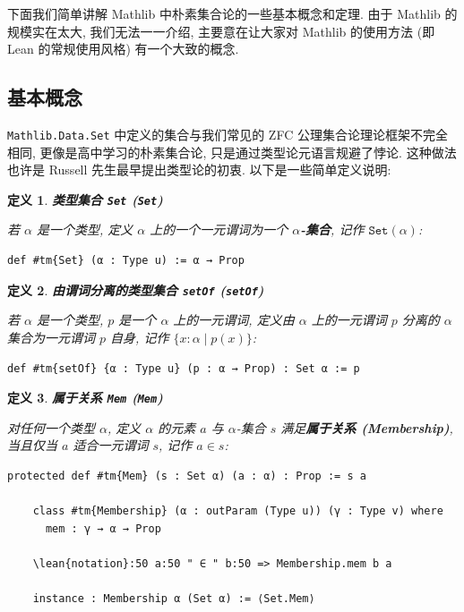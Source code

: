 \documentclass[UTF8]{ctexart}
\DeclareMathOperator{\0}{\mathbf{0}}                    %
\newcommand{\<}{\langle}
\renewcommand{\>}{\rangle}                              %
\newenvironment{dfn_box}{
    \begin{tcolorbox}[enhanced, colback=dfn_green2, boxrule=0pt, frame hidden,
        borderline west={0.7mm}{0.1mm}{dfn_green1},breakable]
    }
    {\end{tcolorbox}}
\theoremstyle{MyStyle} %
\newtheorem{definition}{定义}[subsection]
\newenvironment{dfn}[2]
{
    \begin{dfn_box}
        \begin{definition}
            \textbf{#1
                \ifx\relax#2\relax\else %
                    (#2) %
                \fi}
            \newline
}
{
        \end{definition}
    \end{dfn_box}
}
\newcommand*{\lean}[1]{\texttt{\color{blue}#1}}
\begin{document}
        下面我们简单讲解 Mathlib 中朴素集合论的一些基本概念和定理. 由于 Mathlib 的规模实在太大, 我们无法一一介绍, 主要意在让大家对 Mathlib 的使用方法 (即 Lean 的常规使用风格) 有一个大致的概念. 

    \subsection{基本概念}

    \texttt{Mathlib.Data.Set} 中定义的集合与我们常见的 ZFC 公理集合论理论框架不完全相同, 更像是高中学习的朴素集合论, 只是通过类型论元语言规避了悖论. 这种做法也许是 Russell 先生最早提出类型论的初衷. 以下是一些简单定义说明: 
        
        \begin{dfn}
            {类型集合}
            {\texttt{Set}}
            若 $\alpha$ 是一个类型, 定义 $\alpha$ 上的一个一元谓词为一个 \textbf{$\alpha$-集合}, 记作 $\texttt{Set}(\alpha)$: 
            \begin{lstlisting}[style=lean]
    def #tm{Set} (α : Type u) := α → Prop
            \end{lstlisting}
        \end{dfn}

        \begin{dfn}
            {由谓词分离的类型集合}
            {\texttt{setOf}}
            若 $\alpha$ 是一个类型, $p$ 是一个 $\alpha$ 上的一元谓词, 定义由 $\alpha$ 上的一元谓词 $p$ 分离的 $\alpha$ 集合为一元谓词 $p$ 自身, 记作 $\{x : \alpha \mid p(x)\}$: 
            \begin{lstlisting}[style=lean]
    def #tm{setOf} {α : Type u} (p : α → Prop) : Set α := p
            \end{lstlisting}
        \end{dfn}

        \begin{dfn}
            {属于关系}
            {\texttt{Mem}}
            对任何一个类型 $\alpha$, 定义 $\alpha$ 的元素 $a$ 与 $\alpha$-集合 $s$ 满足\textbf{属于关系 (Membership)}, 当且仅当 $a$ 适合一元谓词 $s$, 记作 $a\in s$: 
            \begin{lstlisting}[style=lean]
    protected def #tm{Mem} (s : Set α) (a : α) : Prop := s a

    class #tm{Membership} (α : outParam (Type u)) (γ : Type v) where
      mem : γ → α → Prop

    \lean{notation}:50 a:50 " ∈ " b:50 => Membership.mem b a
    
    instance : Membership α (Set α) := ⟨Set.Mem⟩
            \end{lstlisting}
        \end{dfn}
\end{document}
